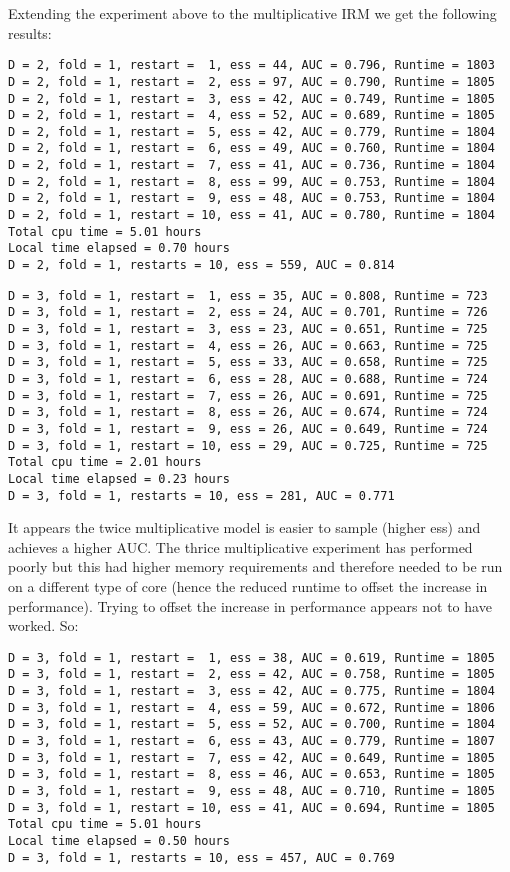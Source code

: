 \documentclass[twoside,11pt]{article}
\begin{document}
Extending the experiment above to the multiplicative IRM we get the following results:
%
\begin{lstlisting}
D = 2, fold = 1, restart =  1, ess = 44, AUC = 0.796, Runtime = 1803
D = 2, fold = 1, restart =  2, ess = 97, AUC = 0.790, Runtime = 1805
D = 2, fold = 1, restart =  3, ess = 42, AUC = 0.749, Runtime = 1805
D = 2, fold = 1, restart =  4, ess = 52, AUC = 0.689, Runtime = 1805
D = 2, fold = 1, restart =  5, ess = 42, AUC = 0.779, Runtime = 1804
D = 2, fold = 1, restart =  6, ess = 49, AUC = 0.760, Runtime = 1804
D = 2, fold = 1, restart =  7, ess = 41, AUC = 0.736, Runtime = 1804
D = 2, fold = 1, restart =  8, ess = 99, AUC = 0.753, Runtime = 1804
D = 2, fold = 1, restart =  9, ess = 48, AUC = 0.753, Runtime = 1804
D = 2, fold = 1, restart = 10, ess = 41, AUC = 0.780, Runtime = 1804
Total cpu time = 5.01 hours
Local time elapsed = 0.70 hours
D = 2, fold = 1, restarts = 10, ess = 559, AUC = 0.814
\end{lstlisting}
%
\begin{lstlisting}
D = 3, fold = 1, restart =  1, ess = 35, AUC = 0.808, Runtime = 723
D = 3, fold = 1, restart =  2, ess = 24, AUC = 0.701, Runtime = 726
D = 3, fold = 1, restart =  3, ess = 23, AUC = 0.651, Runtime = 725
D = 3, fold = 1, restart =  4, ess = 26, AUC = 0.663, Runtime = 725
D = 3, fold = 1, restart =  5, ess = 33, AUC = 0.658, Runtime = 725
D = 3, fold = 1, restart =  6, ess = 28, AUC = 0.688, Runtime = 724
D = 3, fold = 1, restart =  7, ess = 26, AUC = 0.691, Runtime = 725
D = 3, fold = 1, restart =  8, ess = 26, AUC = 0.674, Runtime = 724
D = 3, fold = 1, restart =  9, ess = 26, AUC = 0.649, Runtime = 724
D = 3, fold = 1, restart = 10, ess = 29, AUC = 0.725, Runtime = 725
Total cpu time = 2.01 hours
Local time elapsed = 0.23 hours
D = 3, fold = 1, restarts = 10, ess = 281, AUC = 0.771
\end{lstlisting}
%
It appears the twice multiplicative model is easier to sample (higher ess) and achieves a higher AUC.
The thrice multiplicative experiment has performed poorly but this had higher memory requirements and therefore needed to be run on a different type of core (hence the reduced runtime to offset the increase in performance).
Trying to offset the increase in performance appears not to have worked.
So:
%
\begin{lstlisting}
D = 3, fold = 1, restart =  1, ess = 38, AUC = 0.619, Runtime = 1805
D = 3, fold = 1, restart =  2, ess = 42, AUC = 0.758, Runtime = 1805
D = 3, fold = 1, restart =  3, ess = 42, AUC = 0.775, Runtime = 1804
D = 3, fold = 1, restart =  4, ess = 59, AUC = 0.672, Runtime = 1806
D = 3, fold = 1, restart =  5, ess = 52, AUC = 0.700, Runtime = 1804
D = 3, fold = 1, restart =  6, ess = 43, AUC = 0.779, Runtime = 1807
D = 3, fold = 1, restart =  7, ess = 42, AUC = 0.649, Runtime = 1805
D = 3, fold = 1, restart =  8, ess = 46, AUC = 0.653, Runtime = 1805
D = 3, fold = 1, restart =  9, ess = 48, AUC = 0.710, Runtime = 1805
D = 3, fold = 1, restart = 10, ess = 41, AUC = 0.694, Runtime = 1805
Total cpu time = 5.01 hours
Local time elapsed = 0.50 hours
D = 3, fold = 1, restarts = 10, ess = 457, AUC = 0.769
\end{lstlisting}
\end{document}
